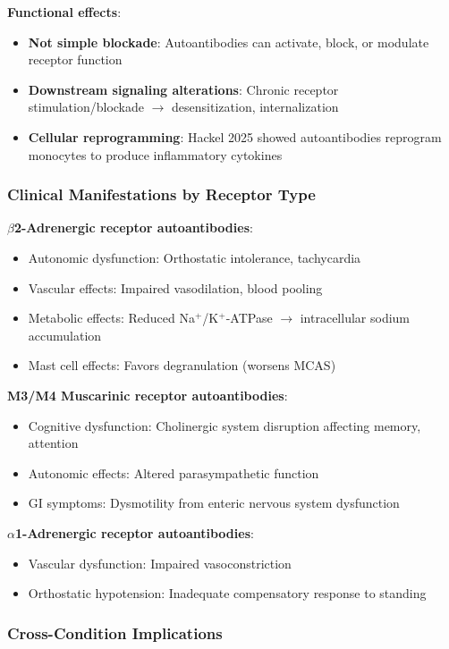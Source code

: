 \textbf{Functional effects}:
\begin{itemize}
    \item \textbf{Not simple blockade}: Autoantibodies can activate, block, or modulate receptor function
    \item \textbf{Downstream signaling alterations}: Chronic receptor stimulation/blockade $\rightarrow$ desensitization, internalization
    \item \textbf{Cellular reprogramming}: Hackel 2025 showed autoantibodies reprogram monocytes to produce inflammatory cytokines
\end{itemize}

\subsubsection{Clinical Manifestations by Receptor Type}

\textbf{$\beta$2-Adrenergic receptor autoantibodies}:
\begin{itemize}
    \item Autonomic dysfunction: Orthostatic intolerance, tachycardia
    \item Vascular effects: Impaired vasodilation, blood pooling
    \item Metabolic effects: Reduced Na$^+$/K$^+$-ATPase $\rightarrow$ intracellular sodium accumulation
    \item Mast cell effects: Favors degranulation (worsens MCAS)
\end{itemize}

\textbf{M3/M4 Muscarinic receptor autoantibodies}:
\begin{itemize}
    \item Cognitive dysfunction: Cholinergic system disruption affecting memory, attention
    \item Autonomic effects: Altered parasympathetic function
    \item GI symptoms: Dysmotility from enteric nervous system dysfunction
\end{itemize}

\textbf{$\alpha$1-Adrenergic receptor autoantibodies}:
\begin{itemize}
    \item Vascular dysfunction: Impaired vasoconstriction
    \item Orthostatic hypotension: Inadequate compensatory response to standing
\end{itemize}

\subsubsection{Cross-Condition Implications}

